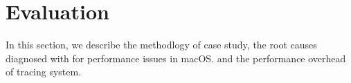 \section{Evaluation}

In this section, we describe the methodlogy of case study, the root causes
diagnosed with \xxx for performance issues in macOS.  and the performance
overhead of \xxx tracing system.





